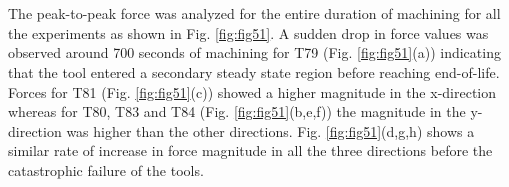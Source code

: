 \documentclass[preprint,review,12pt]{elsarticle}
\begin{document}
\begin{minipage}{\linewidth}
   \label{tab:T51}
  \centering
\end{minipage} \\\\

The peak-to-peak force was analyzed for the entire duration of machining for all the experiments as shown in Fig. \ref{fig:fig51}. A sudden drop in force values was observed around 700 seconds of machining for T79 (Fig. \ref{fig:fig51}(a)) indicating that the tool entered a secondary steady state region before reaching end-of-life. Forces for T81 (Fig. \ref{fig:fig51}(c)) showed a higher magnitude in the x-direction whereas for T80, T83 and T84 (Fig. \ref{fig:fig51}(b,e,f)) the magnitude in the y-direction was higher than the other directions. Fig. \ref{fig:fig51}(d,g,h) shows a similar rate of increase in force magnitude in all the three directions before the catastrophic failure of the tools. \par
\end{document}
